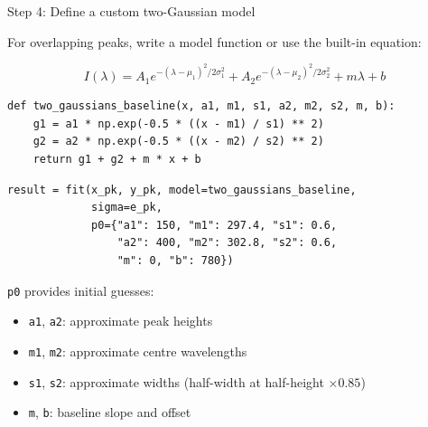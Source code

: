 \documentclass[handout, 10pt]{beamer}
\begin{document}
\begin{frame}[fragile]{Step 4: Define a custom two-Gaussian model}

For overlapping peaks, write a model function or use the built-in equation:

\[
I(\lambda) = A_1 e^{-(\lambda-\mu_1)^2/2\sigma_1^2}
           + A_2 e^{-(\lambda-\mu_2)^2/2\sigma_2^2}
           + m\lambda + b
\]

\begin{lstlisting}[style=pysmall]
def two_gaussians_baseline(x, a1, m1, s1, a2, m2, s2, m, b):
    g1 = a1 * np.exp(-0.5 * ((x - m1) / s1) ** 2)
    g2 = a2 * np.exp(-0.5 * ((x - m2) / s2) ** 2)
    return g1 + g2 + m * x + b
\end{lstlisting}

\begin{lstlisting}[style=pysmall]
result = fit(x_pk, y_pk, model=two_gaussians_baseline,
             sigma=e_pk,
             p0={"a1": 150, "m1": 297.4, "s1": 0.6,
                 "a2": 400, "m2": 302.8, "s2": 0.6,
                 "m": 0, "b": 780})
\end{lstlisting}

\medskip
\texttt{p0} provides initial guesses:
\begin{itemize}
    \scriptsize
    \item \texttt{a1}, \texttt{a2}: approximate peak heights
    \item \texttt{m1}, \texttt{m2}: approximate centre wavelengths
    \item \texttt{s1}, \texttt{s2}: approximate widths (half-width at half-height $\times 0.85$)
    \item \texttt{m}, \texttt{b}: baseline slope and offset
\end{itemize}
\end{frame}
\end{document}
